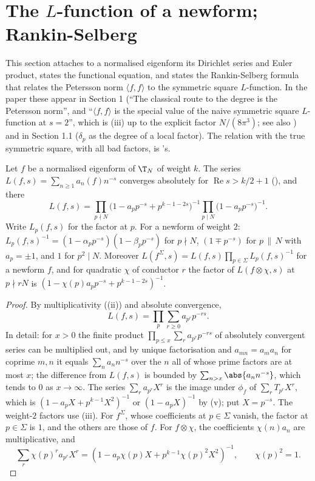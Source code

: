 \section{The $L$-function of a newform; Rankin-Selberg}\label{sec:hecke:lfunctions}

This section attaches to a normalised eigenform its Dirichlet series and Euler product, states the functional equation, and states the Rankin-Selberg formula that relates
the Petersson norm $\langle f,f\rangle$ to the symmetric square $L$-function. In the paper these appear in Section 1 (``The classical route to the degree is the Petersson norm'', and
``$\langle f,f\rangle$ is the special value of the naive symmetric square $L$-function at $s=2$'', which is (iii) up to the explicit factor $N/(8\pi^3)$; see also
) and in Section 1.1 ($\delta_p$ as the degree of a local factor). The relation with the true symmetric square, with all bad factors, is 's.

\begin{proposition}\label{prop:hecke:euler-product}
Let $f$ be a normalised eigenform of $\T_N$ of weight $k$. The series $L(f,s)=\sum_{n\ge1}a_n(f)n^{-s}$ converges absolutely for $\operatorname{Re}s>k/2+1$ (), and there
\[
L(f,s)=\prod_{p\nmid N}\bigl(1-a_pp^{-s}+p^{k-1-2s}\bigr)^{-1}\prod_{p\mid N}\bigl(1-a_pp^{-s}\bigr)^{-1}.
\]
Write $L_p(f,s)$ for the factor at $p$. For a newform of weight $2$: $L_p(f,s)^{-1}=(1-\alpha_pp^{-s})(1-\beta_pp^{-s})$ for $p\nmid N$, $(1\mp p^{-s})$ for $p\,\|\,N$ with $a_p=\pm1$, and $1$ for $p^2\mid N$. Moreover
$L(f^\Sigma,s)=L(f,s)\prod_{p\in\Sigma}L_p(f,s)^{-1}$ for a newform $f$, and for quadratic $\chi$ of conductor $r$ the factor of $L(f\otimes\chi,s)$ at $p\nmid rN$ is
$(1-\chi(p)a_pp^{-s}+p^{k-1-2s})^{-1}$.
\end{proposition}

\begin{proof}
By multiplicativity ((ii)) and absolute convergence,
\[
L(f,s)=\prod_p\sum_{r\ge0}a_{p^r}p^{-rs}.
\]
In detail: for $x>0$ the finite product $\prod_{p\le x}\sum_ra_{p^r}p^{-rs}$ of absolutely convergent series can be multiplied out, and by unique factorisation and
$a_{mn}=a_ma_n$ for coprime $m,n$ it equals $\sum_na_nn^{-s}$ over the $n$ all of whose prime factors are at most $x$; the difference from $L(f,s)$ is bounded by $\sum_{n>x}\abs{a_nn^{-s}}$,
which tends to $0$ as $x\to\infty$.
The series $\sum_ra_{p^r}X^r$ is the image under $\phi_f$ of $\sum_rT_{p^r}X^r$, which is $(1-a_pX+p^{k-1}X^2)^{-1}$ or $(1-a_pX)^{-1}$ by (v); put $X=p^{-s}$. The weight-$2$ factors use (iii). For $f^\Sigma$, whose
coefficients at $p\in\Sigma$ vanish, the factor at $p\in\Sigma$ is $1$, and the others are those of $f$. For $f\otimes\chi$, the coefficients $\chi(n)a_n$ are multiplicative, and
\[
\sum_r\chi(p)^ra_{p^r}X^r=(1-a_p\chi(p)X+p^{k-1}\chi(p)^2X^2)^{-1},\qquad\chi(p)^2=1.
\]
\end{proof}

